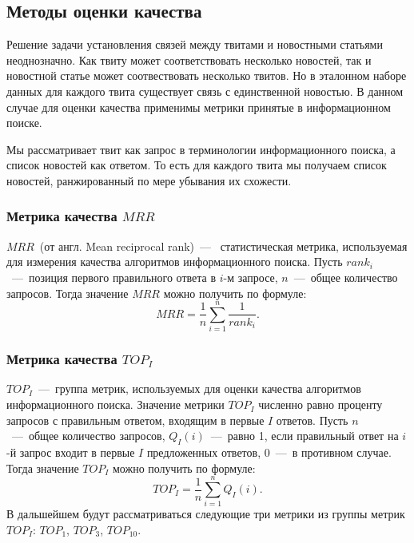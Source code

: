 \subsection{Методы оценки качества}
    Решение задачи установления связей между твитами и новостными статьями неоднозначно.
    Как твиту может соответствовать несколько новостей, так и новостной статье может соотвествовать несколько твитов.
    Но в эталонном наборе данных для каждого твита существует связь с единственной новостью.
    В данном случае для оценки качества применимы метрики принятые в информационном поиске.

    Мы рассматривает твит как запрос в терминологии информационного поиска, а список новостей как ответом.
    То есть для каждого твита мы получаем список новостей, ранжированный по мере убывания их схожести.

    \subsubsection{Метрика качества $MRR$}
    \label{subsubsec:MRR}
        $MRR$~(от англ. Mean reciprocal rank)~---~ статистическая метрика, используемая для измерения качества алгоритмов информационного поиска.
        Пусть $rank_i$~---~позиция первого правильного ответа в $i$-м запросе, $n$~---~общее количество запросов.
        Тогда значение $MRR$ можно получить по формуле:
        $$MRR = \dfrac{1}{n} \sum_{i=1}^n \dfrac{1}{rank_i}.$$

    \subsubsection{Метрика качества $TOP_I$}
        $TOP_I$~---~группа метрик, используемых для оценки качества алгоритмов информационного поиска. Значение метрики $TOP_I$
        численно равно проценту запросов с правильным ответом, входящим в первые $I$ ответов.
        Пусть $n$~---~общее количество запросов, $Q_I(i)$~---~равно 1, если правильный ответ на $i$-й запрос входит в первые $I$ предложенных ответов, 0~---~в противном случае.
        Тогда значение $TOP_I$ можно получить по формуле:
        $$TOP_I=\dfrac{1} {n} \sum_{i=1}^n Q_I(i).$$
        В дальшейшем будут рассматриваться следующие три метрики из группы метрик $TOP_I$: $TOP_1$, $TOP_3$, $TOP_{10}$.



